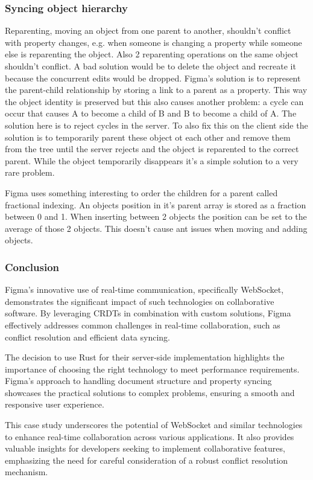 \subsubsection*{Syncing object hierarchy}

Reparenting, moving an object from one parent to another, shouldn't conflict with property changes, e.g. when someone is changing a property while someone else is reparenting the object. Also 2 reparenting operations on the same object shouldn't conflict. A bad solution would be to delete the object and recreate it because the concurrent edits would be dropped. Figma's solution is to represent the parent-child relationship by storing a link to a parent as a property. This way the object identity is preserved but this also causes another problem: a cycle can occur that causes A to become a child of B and B to become a child of A. The solution here is to reject cycles in the server. To also fix this on the client side the solution is to temporarily parent these object ot each other and remove them from the tree until the server rejects and the object is reparented to the correct parent. While the object temporarily disappears it's a simple solution to a very rare problem.

Figma uses something interesting to order the children for a parent called fractional indexing. An objects position in it's parent array is stored as a fraction between 0 and 1. When inserting between 2 objects the position can be set to the average of those 2 objects. This doesn't cause ant issues when moving and adding objects.

\subsubsection*{Conclusion}

Figma's innovative use of real-time communication, specifically WebSocket, demonstrates the significant impact of such technologies on collaborative software. By leveraging CRDTs in combination with custom solutions, Figma effectively addresses common challenges in real-time collaboration, such as conflict resolution and efficient data syncing.

The decision to use Rust for their server-side implementation highlights the importance of choosing the right technology to meet performance requirements. Figma's approach to handling document structure and property syncing showcases the practical solutions to complex problems, ensuring a smooth and responsive user experience.

This case study underscores the potential of WebSocket and similar technologies to enhance real-time collaboration across various applications. It also provides valuable insights for developers seeking to implement collaborative features, emphasizing the need for careful consideration of a robust conflict resolution mechanism.
